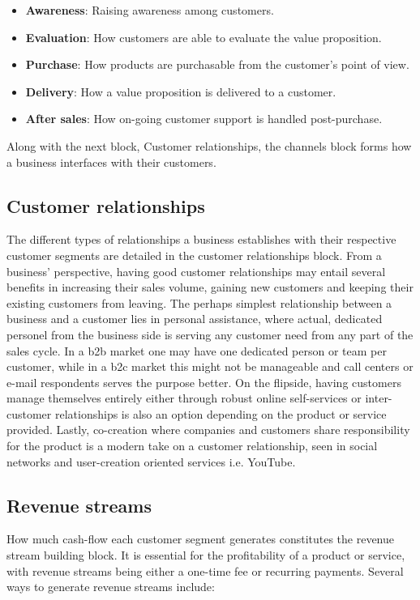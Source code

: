 \begin{itemize}
    \item \textbf{Awareness}: Raising awareness among customers.
    \item \textbf{Evaluation}: How customers are able to evaluate the value proposition.
    \item \textbf{Purchase}: How products are purchasable from the customer's point of view.
    \item \textbf{Delivery}: How a value proposition is delivered to a customer.
    \item \textbf{After sales}: How on-going customer support is handled post-purchase.
\end{itemize}
Along with the next block, Customer relationships, the channels block forms how a business interfaces with their customers. 

\subsection{Customer relationships}
The different types of relationships a business establishes with their respective customer segments are detailed in the customer relationships block. From a business' perspective, having good customer relationships may entail several benefits in increasing their sales volume, gaining new customers and keeping their existing customers from leaving. The perhaps simplest relationship between a business and a customer lies in personal assistance, where actual, dedicated personel from the business side is serving any customer need from any part of the sales cycle. In a \gls{b2b} market one may have one dedicated person or team per customer, while in a \gls{b2c} market this might not be manageable and call centers or e-mail respondents serves the purpose better. On the flipside, having customers manage themselves entirely either through robust online self-services or inter-customer relationships is also an option depending on the product or service provided. Lastly, co-creation where companies and customers share responsibility for the product is a modern take on a customer relationship, seen in social networks and user-creation oriented services i.e. YouTube.

\subsection{Revenue streams}
How much cash-flow each customer segment generates constitutes the revenue stream building block. It is essential for the profitability of a product or service, with revenue streams being either a one-time fee or recurring payments. Several ways to generate revenue streams include:

